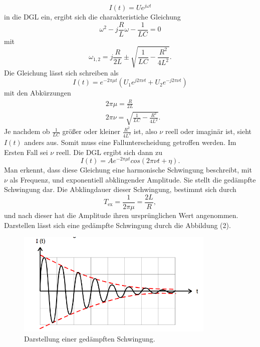 \begin{equation*}
I(t) = U e^{j\omega t}
\end{equation*}
in die DGL ein, ergibt sich die charakteristiche Gleichung
\begin{equation}
\omega^{2} - j\frac{R}{L}\omega - \frac{1}{LC} = 0 
\end{equation}
\noindent mit 
\begin{equation}
\omega_{1,2} = j \frac{R}{2L} \pm \sqrt{\frac{1}{LC} - \frac{R^{2}}{4L^{2}}} .
\end{equation}
\noindent Die Gleichung lässt sich schreiben als 
\begin{equation}
I(t) = e^{-2\pi \mu t}(U_1 e^{j2\pi \nu t} + U_2 e^{-j2\pi \nu t})
\end{equation}
\noindent mit den Abkürzungen 
\begin{align}
&2\pi \mu = \frac{R}{2L} \\
&2\pi \nu = \sqrt{\frac{1}{LC} - \frac{R^{2}}{4L^{2}}} .
\end{align}
\noindent Je nachdem ob $\frac{1}{LC}$ größer oder kleiner $\frac{R^2}{4L^2}$ ist, also $\nu$ reell oder imaginär ist,
sieht $I(t)$ anders aus. Somit muss eine Fallunterscheidung getroffen werden.
Im Ersten Fall sei $\nu$ reell. Die DGL ergibt sich dann zu
\begin{equation}
I(t) = Ae^{-2\pi \mu t}cos(2\pi \nu t + \eta) .
\end{equation}
Man erkennt, dass diese Gleichung eine harmonische Schwingung beschreibt, mit $\nu$ als Frequenz, und exponentiell abklingender Amplitude.
Sie stellt die gedämpfte Schwingung dar. Die Abklingdauer dieser Schwingung, bestimmt sich durch
\begin{equation}
T_\text{ex} = \frac{1}{2\pi \mu} = \frac{2L}{R} ,
\end{equation}
und nach dieser hat die Amplitude ihren ursprünglichen Wert angenommen.
Darstellen lässt sich eine gedämpfte Schwingung durch die Abbildung (2).
\begin{figure}[H]
  \centering
  \includegraphics[height=5cm]{grenzfall.png}
  \caption{Darstellung einer gedämpften Schwingung. \cite[S.4]{kent}}
\end{figure}
